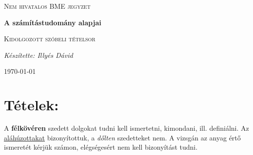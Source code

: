\documentclass[10pt]{article}
\begin{document}
\begin{titlepage}
	\centering \vfill
	{\textsc{Nem hivatalos BME jegyzet} \par} \vspace{7cm}
	{\huge\bfseries A számítástudomány alapjai\par} \vspace{0.5cm}
	{\large \textsc{Kidolgozott szóbeli tételsor}\par} \vspace{1.5cm}
	{\Large\itshape Készítette: Illyés Dávid\par} \vfill

	\noindent{}

	
	\vfill {\large \today\par}
\end{titlepage} 
\tableofcontents
{}

    \section*{Tételek:}

        A \textbf{félkövéren} szedett dolgokat tudni kell ismertetni, kimondani, ill. definiálni. Az \underline{aláhúzottakat} bizonyítottuk, a \textit{dőlten} szedetteket nem. A vizsgán az anyag értő ismeretét kérjük számon, elégségesért nem kell bizonyítást tudni.
\end{document}
